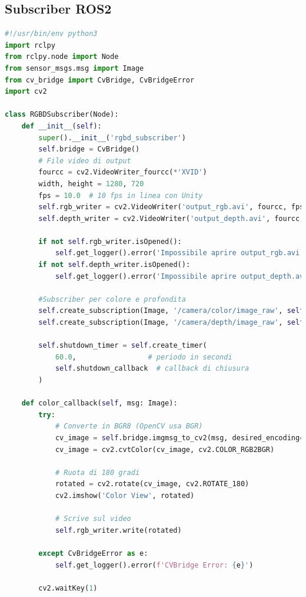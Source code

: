 \documentclass[11pt]{report}
\begin{document}
\subsection{Subscriber ROS2}
\begin{lstlisting}[language=Python, caption=Subscriber RGB-D ROS2 con salvataggio video, label=lst:rgbd_subscriber]
#!/usr/bin/env python3
import rclpy
from rclpy.node import Node
from sensor_msgs.msg import Image
from cv_bridge import CvBridge, CvBridgeError
import cv2

class RGBDSubscriber(Node):
    def __init__(self):
        super().__init__('rgbd_subscriber')
        self.bridge = CvBridge()
        # File video di output
        fourcc = cv2.VideoWriter_fourcc(*'XVID')
        width, height = 1280, 720
        fps = 10.0  # 10 fps in linea con Unity
        self.rgb_writer = cv2.VideoWriter('output_rgb.avi', fourcc, fps, (width, height))
        self.depth_writer = cv2.VideoWriter('output_depth.avi', fourcc, fps, (width, height), isColor=False)

        if not self.rgb_writer.isOpened():
            self.get_logger().error('Impossibile aprire output_rgb.avi') 
        if not self.depth_writer.isOpened():
            self.get_logger().error('Impossibile aprire output_depth.avi') 

        #Subscriber per colore e profondita
        self.create_subscription(Image, '/camera/color/image_raw', self.color_callback, 10)
        self.create_subscription(Image, '/camera/depth/image_raw', self.depth_callback, 10)

        self.shutdown_timer = self.create_timer(
            60.0,                 # periodo in secondi
            self.shutdown_callback  # callback di chiusura
        )

    def color_callback(self, msg: Image):
        try:
            # Converte in BGR8 (OpenCV usa BGR)
            cv_image = self.bridge.imgmsg_to_cv2(msg, desired_encoding='rgb8')
            cv_image = cv2.cvtColor(cv_image, cv2.COLOR_RGB2BGR)

            # Ruota di 180 gradi
            rotated = cv2.rotate(cv_image, cv2.ROTATE_180)
            cv2.imshow('Color View', rotated)

            # Scrive sul video
            self.rgb_writer.write(rotated)

        except CvBridgeError as e:
            self.get_logger().error(f'CVBridge Error: {e}')
        
        cv2.waitKey(1)


\end{lstlisting}
\end{document}
